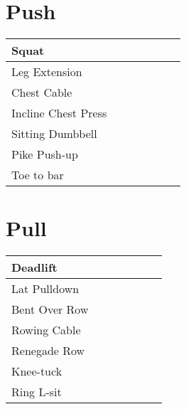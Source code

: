\usepackage[margin=0.5in]{geometry}


\renewcommand{\familydefault}{\sfdefault}
\renewcommand{\seriesdefault}{\bfdefault}

\renewcommand{\arraystretch}{2.5}


\begin{landscape}

\section*{Push}

\huge
\noindent\begin{tabularx}{\columnwidth}{ |l|*{6}{R|} }
  \hline
  Squat                            &&&&&&    \\
  \hline
  Leg Extension                    &&&&&&    \\
  \hline
  Chest Cable                      &&&&&&    \\
  \hline
  Incline Chest Press              &&&&&&    \\
  \hline
  Sitting Dumbbell                 &&&&&&    \\
  \hline
  Pike Push-up                     &&&&&&    \\
  \hline
  Toe to bar                       &&&&&&    \\
  \hline
\end{tabularx}

\pagebreak

\section*{Pull}

\noindent\begin{tabularx}{\columnwidth}{ |l|*{6}{R|} }
  \hline
  Deadlift                         &&&&&&    \\
  \hline
  Lat Pulldown                     &&&&&&    \\
  \hline
  Bent Over Row                    &&&&&&    \\
  \hline
  Rowing Cable                     &&&&&&    \\
  \hline
  Renegade Row                     &&&&&&    \\
  \hline
  Knee-tuck                        &&&&&&    \\
  \hline
  Ring L-sit                       &&&&&&    \\
  \hline
\end{tabularx}

\end{landscape}

